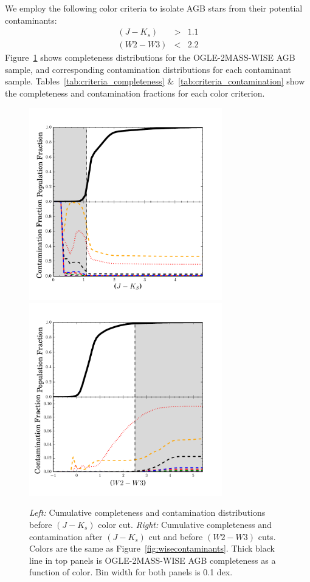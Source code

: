 We employ the following color criteria to isolate AGB stars from their potential contaminants:
\begin{eqnarray}
(J - K_s) &>& 1.1\\
(W2 - W3) &<&  2.2
\end{eqnarray}
\noindent Figure~\ref{fig:colorcuts} shows completeness distributions for the OGLE-2MASS-WISE AGB sample, and corresponding contamination distributions for each contaminant sample. Tables~\ref{tab:criteria_completeness} \&~\ref{tab:criteria_contamination} show the completeness and contamination fractions for each color criterion. 

\begin{figure}[h]
\includegraphics[width=3.3in]{figs/completeness_contamination_jkcut.pdf}\includegraphics[width=3.3in]{figs/completeness_contamination_w23cut.pdf}
\caption{\emph{Left:} Cumulative completeness and contamination distributions before $(J-K_s)$ color cut. \emph{Right:} Cumulative completeness and contamination after $(J-K_s)$ cut and before $(W2-W3)$ cuts. Colors are the same as Figure~\ref{fig:wisecontaminants}. Thick black line in top panels is OGLE-2MASS-WISE AGB completeness as a function of color. Bin width for both panels is 0.1 dex. \label{fig:colorcuts}}
\end{figure}

